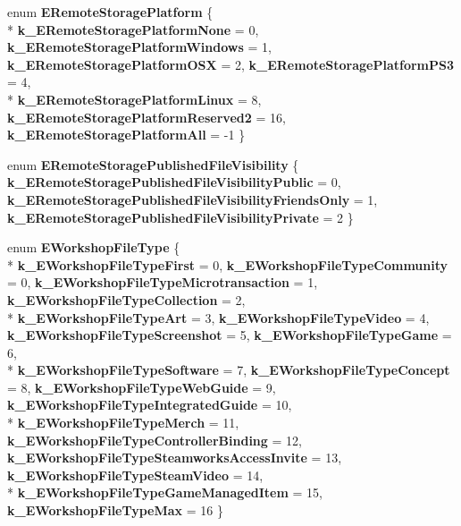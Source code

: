 \begin{DoxyCompactItemize}
\item 
\hypertarget{namespaceValve_1_1Steamworks_ad910a2698cafc253afc8d9ddbf9183e9}{}enum {\bfseries E\+Remote\+Storage\+Platform} \{ \\*
{\bfseries k\+\_\+\+E\+Remote\+Storage\+Platform\+None} = 0, 
{\bfseries k\+\_\+\+E\+Remote\+Storage\+Platform\+Windows} = 1, 
{\bfseries k\+\_\+\+E\+Remote\+Storage\+Platform\+O\+S\+X} = 2, 
{\bfseries k\+\_\+\+E\+Remote\+Storage\+Platform\+P\+S3} = 4, 
\\*
{\bfseries k\+\_\+\+E\+Remote\+Storage\+Platform\+Linux} = 8, 
{\bfseries k\+\_\+\+E\+Remote\+Storage\+Platform\+Reserved2} = 16, 
{\bfseries k\+\_\+\+E\+Remote\+Storage\+Platform\+All} = -\/1
 \}\label{namespaceValve_1_1Steamworks_ad910a2698cafc253afc8d9ddbf9183e9}

\item 
\hypertarget{namespaceValve_1_1Steamworks_a2123a5b99513ae8397d240a720bac0ab}{}enum {\bfseries E\+Remote\+Storage\+Published\+File\+Visibility} \{ {\bfseries k\+\_\+\+E\+Remote\+Storage\+Published\+File\+Visibility\+Public} = 0, 
{\bfseries k\+\_\+\+E\+Remote\+Storage\+Published\+File\+Visibility\+Friends\+Only} = 1, 
{\bfseries k\+\_\+\+E\+Remote\+Storage\+Published\+File\+Visibility\+Private} = 2
 \}\label{namespaceValve_1_1Steamworks_a2123a5b99513ae8397d240a720bac0ab}

\item 
\hypertarget{namespaceValve_1_1Steamworks_a5f0138cfef9f170b2e8bffb67f0ee201}{}enum {\bfseries E\+Workshop\+File\+Type} \{ \\*
{\bfseries k\+\_\+\+E\+Workshop\+File\+Type\+First} = 0, 
{\bfseries k\+\_\+\+E\+Workshop\+File\+Type\+Community} = 0, 
{\bfseries k\+\_\+\+E\+Workshop\+File\+Type\+Microtransaction} = 1, 
{\bfseries k\+\_\+\+E\+Workshop\+File\+Type\+Collection} = 2, 
\\*
{\bfseries k\+\_\+\+E\+Workshop\+File\+Type\+Art} = 3, 
{\bfseries k\+\_\+\+E\+Workshop\+File\+Type\+Video} = 4, 
{\bfseries k\+\_\+\+E\+Workshop\+File\+Type\+Screenshot} = 5, 
{\bfseries k\+\_\+\+E\+Workshop\+File\+Type\+Game} = 6, 
\\*
{\bfseries k\+\_\+\+E\+Workshop\+File\+Type\+Software} = 7, 
{\bfseries k\+\_\+\+E\+Workshop\+File\+Type\+Concept} = 8, 
{\bfseries k\+\_\+\+E\+Workshop\+File\+Type\+Web\+Guide} = 9, 
{\bfseries k\+\_\+\+E\+Workshop\+File\+Type\+Integrated\+Guide} = 10, 
\\*
{\bfseries k\+\_\+\+E\+Workshop\+File\+Type\+Merch} = 11, 
{\bfseries k\+\_\+\+E\+Workshop\+File\+Type\+Controller\+Binding} = 12, 
{\bfseries k\+\_\+\+E\+Workshop\+File\+Type\+Steamworks\+Access\+Invite} = 13, 
{\bfseries k\+\_\+\+E\+Workshop\+File\+Type\+Steam\+Video} = 14, 
\\*
{\bfseries k\+\_\+\+E\+Workshop\+File\+Type\+Game\+Managed\+Item} = 15, 
{\bfseries k\+\_\+\+E\+Workshop\+File\+Type\+Max} = 16
 \}\label{namespaceValve_1_1Steamworks_a5f0138cfef9f170b2e8bffb67f0ee201}


\end{DoxyCompactItemize}
